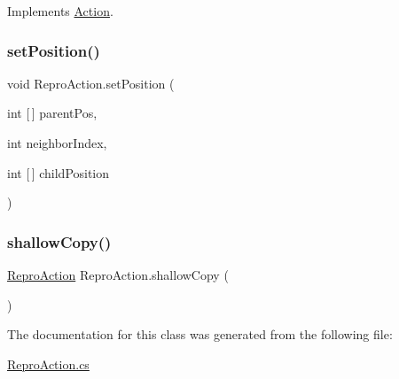 Implements \mbox{\hyperlink{class_action_a2aedfc3be16448fbf224cb13607de3c0}{Action}}.

\mbox{\label{class_repro_action_a0f1b2a6774238b935c3b2c544be7b5e0}} 
\subsubsection{\texorpdfstring{set\+Position()}{setPosition()}}
{\footnotesize\ttfamily void Repro\+Action.\+set\+Position (\begin{DoxyParamCaption}\item[{int \mbox{[}$\,$\mbox{]}}]{parent\+Pos,  }\item[{int}]{neighbor\+Index,  }\item[{int \mbox{[}$\,$\mbox{]}}]{child\+Position }\end{DoxyParamCaption})}

\mbox{\label{class_repro_action_ae68477b2e64171bf9a3bf20458fcc96c}} 
\subsubsection{\texorpdfstring{shallow\+Copy()}{shallowCopy()}}
{\footnotesize\ttfamily \mbox{\hyperlink{class_repro_action}{Repro\+Action}} Repro\+Action.\+shallow\+Copy (\begin{DoxyParamCaption}{ }\end{DoxyParamCaption})}



The documentation for this class was generated from the following file\+:\begin{DoxyCompactItemize}
\item 
\mbox{\hyperlink{_repro_action_8cs}{Repro\+Action.\+cs}}\end{DoxyCompactItemize}

